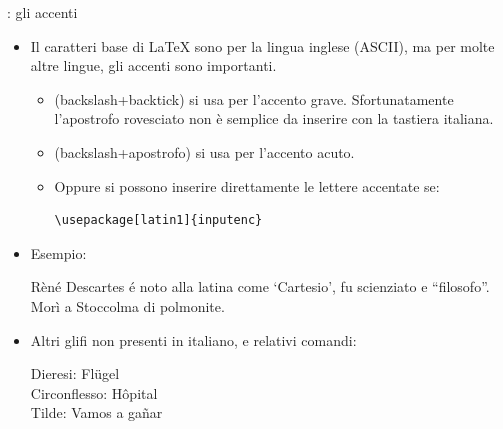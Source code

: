 \documentclass{beamer}
\begin{document}
\begin{frame}[fragile]{\insertsubsection{}: gli accenti}
\small
\begin{itemize}
\item Il caratteri base di \LaTeX{} sono per la lingua inglese (ASCII), ma per molte altre lingue, gli accenti sono importanti.
\begin{itemize}
\item {} (backslash+backtick) si usa per l'accento grave. Sfortunatamente l'apostrofo rovesciato non \`e semplice da inserire con la tastiera italiana.
\item {} (backslash+apostrofo) si usa per l'accento acuto.
\item Oppure si possono inserire direttamente le lettere accentate se:
\begin{verbatim}
\usepackage[latin1]{inputenc}
\end{verbatim}
\end{itemize}
\item Esempio:
\begin{exampletwouptiny}
R\`{e}n\'{e} Descartes \'{e} noto
alla latina come `Cartesio', 
fu scienziato e ``filosofo''.
Mor\`{i} a Stoccolma di polmonite.
\end{exampletwouptiny}

\item Altri glifi non presenti in italiano, e relativi comandi:
\begin{exampletwouptiny}
Dieresi: Fl\"ugel\\
Circonflesso: H\^opital\\
Tilde: Vamos a ga\~nar\\
\end{exampletwouptiny}
\end{itemize}
\end{frame}
\end{document}
